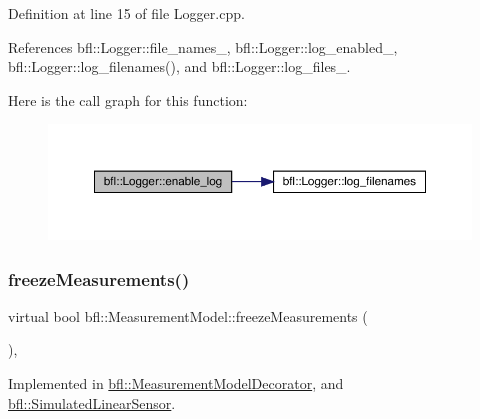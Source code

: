 Definition at line 15 of file Logger.\+cpp.



References bfl\+::\+Logger\+::file\+\_\+names\+\_\+, bfl\+::\+Logger\+::log\+\_\+enabled\+\_\+, bfl\+::\+Logger\+::log\+\_\+filenames(), and bfl\+::\+Logger\+::log\+\_\+files\+\_\+.

Here is the call graph for this function\+:
\nopagebreak
\begin{figure}[H]
\begin{center}
\leavevmode
\includegraphics[width=350pt]{classbfl_1_1Logger_ae94b97b6e8d7902e8ce048384813122e_cgraph}
\end{center}
\end{figure}
\mbox{\label{classbfl_1_1MeasurementModel_a67ef096c5b3682252582aec75498089d}} 
\subsubsection{\texorpdfstring{freeze\+Measurements()}{freezeMeasurements()}}
{\footnotesize\ttfamily virtual bool bfl\+::\+Measurement\+Model\+::freeze\+Measurements (\begin{DoxyParamCaption}{ }\end{DoxyParamCaption})\hspace{0.3cm}{\ttfamily [pure virtual]}, {\ttfamily [inherited]}}



Implemented in \mbox{\hyperlink{classbfl_1_1MeasurementModelDecorator_a17d5fb12bfa048ca56160f745f112e32}{bfl\+::\+Measurement\+Model\+Decorator}}, and \mbox{\hyperlink{classbfl_1_1SimulatedLinearSensor_a683f147d792a79c5ad4c6746210dfdee}{bfl\+::\+Simulated\+Linear\+Sensor}}.

\mbox{\label{classbfl_1_1Logger_a913a795b7bfbf378815eeb342d68a7c0}} 
